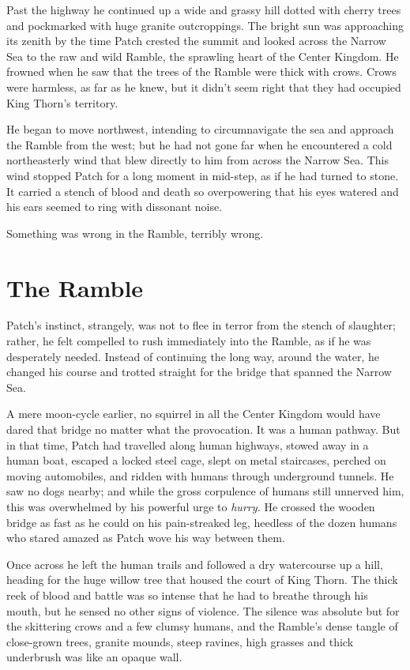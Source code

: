 \documentclass[12pt]{book}
\begin{document}
Past the highway he continued up a wide and grassy hill dotted with cherry trees and pockmarked with huge granite outcroppings. The bright sun was approaching its zenith by the time Patch crested the summit and looked across the Narrow Sea to the raw and wild Ramble, the sprawling heart of the Center Kingdom. He frowned when he saw that the trees of the Ramble were thick with crows. Crows were harmless, as far as he knew, but it didn't seem right that they had occupied King Thorn's territory. 

He began to move northwest, intending to circumnavigate the sea and approach the Ramble from the west; but he had not gone far when he encountered a cold northeasterly wind that blew directly to him from across the Narrow Sea. This wind stopped Patch for a long moment in mid-step, as if he had turned to stone. It carried a stench of blood and death so overpowering that his eyes watered and his ears seemed to ring with dissonant noise.

Something was wrong in the Ramble, terribly wrong.


\section{The Ramble}

Patch's instinct, strangely, was not to flee in terror from the stench of slaughter; rather, he felt compelled to rush immediately into the Ramble, as if he was desperately needed. Instead of continuing the long way, around the water, he changed his course and trotted straight for the bridge that spanned the Narrow Sea.

A mere moon-cycle earlier, no squirrel in all the Center Kingdom would have dared that bridge no matter what the provocation. It was a human pathway. But in that time, Patch had travelled along human highways, stowed away in a human boat, escaped a locked steel cage, slept on metal staircases, perched on moving automobiles, and ridden with humans through underground tunnels. He saw no dogs nearby; and while the gross corpulence of humans still unnerved him, this was overwhelmed by his powerful urge to {\it hurry.} He crossed the wooden bridge as fast as he could on his pain-streaked leg, heedless of the dozen humans who stared amazed as Patch wove his way between them.

Once across he left the human trails and followed a dry watercourse up a hill, heading for the huge willow tree that housed the court of King Thorn. The thick reek of blood and battle was so intense that he had to breathe through his mouth, but he sensed no other signs of violence. The silence was absolute but for the skittering crows and a few clumsy humans, and the Ramble's dense tangle of close-grown trees, granite mounds, steep ravines, high grasses and thick underbrush was like an opaque wall.
\end{document}
